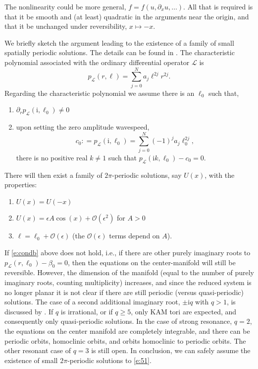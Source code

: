 \documentclass[review,onefignum,onetabnum]{siamart171218}
\def\coloneqq{\mathrel{\mathop:}=}
\newcommand{\rmi}{\mathrm{i}}
\newcommand{\calL}{\mathcal{L}}
\newcommand{\calO}{\mathcal{O}}
\begin{document}
\begin{remark}
The nonlinearity could be more general, $f=f(u,\partial_xu,\dots)$. All that is required is that it be smooth and (at least) quadratic in the arguments near the origin, and that it be unchanged under reversibility, $x\mapsto-x$.
\end{remark}

We briefly sketch the argument leading to the existence of a family of small spatially periodic solutions. The details can be found in \cite[Theorem~3.15]{haragus:lbc11}.
The characteristic polynomial associated with the ordinary differential operator
$\calL$ is
\[
p_{\calL}(r,\ell)=\sum_{j=0}^Na_j\ell^{2j}r^{2j}.
\]
Regarding the characteristic polynomial we assume there is an $\ell_0$ such that,
\begin{enumerate}
\item $\partial_rp_{\calL}(\rmi,\ell_0)\neq0$
\item upon setting the zero amplitude wavespeed,
\begin{equation}\label{e:condb}
c_0\coloneqq p_{\calL}(\rmi,\ell_0)=\sum_{j=0}^N(-1)^ja_j\ell_0^{2j},
\end{equation}
there is no positive real $k\neq1$ such that $p_{\calL}(\rmi
    k,\ell_0)-c_0=0$.
\end{enumerate}
There will then exist a family of
$2\pi$-periodic solutions, say $U(x)$, with the properties:
\begin{enumerate}
\item $U(x)=U(-x)$
\item $U(x)=\epsilon A\cos(x)+\calO(\epsilon^2)$ for $A>0$
\item $\ell=\ell_0+\calO(\epsilon)$ (the $\calO(\epsilon)$ terms depend on
    $A$).
\end{enumerate}

If \cref{e:condb} above does not hold, i.e., if there are other purely
imaginary roots to $p_{\calL}(r,\ell_0)-\beta_0=0$, then the equations on the
center-manifold will still be reversible. However, the dimension of the
manifold (equal to the number of purely imaginary roots, counting
multiplicity) increases, and since the reduced system is no longer planar it
is not clear if there are still periodic (versus quasi-periodic) solutions.
The case of a second additional imaginary root, $\pm\rmi q$ with $q>1$, is
discussed by \cite[Chapter~4.3.4]{haragus:lbc11}. If $q$ is irrational, or
if $q\ge5$, only KAM tori are expected, and consequently only quasi-periodic
solutions. In the case of strong resonance, $q=2$, the equations on the
center manifold are completely integrable, and there can be periodic orbits,
homoclinic orbits, and orbits homoclinic to periodic orbits. The other
resonant case of $q=3$ is still open.
In conclusion, we can safely assume the existence of small $2\pi$-periodic
solutions to \cref{e:51}.
\end{document}
